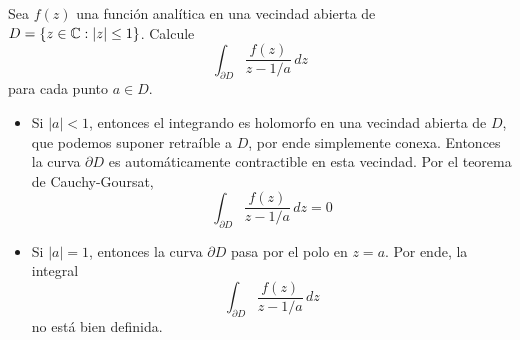 \begin{exercise}
Sea $f(z)$ una función analítica en una vecindad abierta de $D = \{ z \in \mathbb C : |z| \le 1 \}$. Calcule
$$\int_{\partial D} \frac {f(z)} {z - 1/a} \, dz$$
para cada punto $a \in D$.
\end{exercise}

\begin{solution}
\leavevmode
\begin{itemize}
    \item Si $|a| < 1$, entonces el integrando es holomorfo en una vecindad abierta de $D$, que podemos suponer retraíble a $D$, por ende simplemente conexa. Entonces la curva $\partial D$ es automáticamente contractible en esta vecindad. Por el teorema de Cauchy-Goursat,
    $$\int_{\partial D} \frac {f(z)} {z - 1/a} \, dz = 0$$
    
    \item Si $|a| = 1$, entonces la curva $\partial D$ pasa por el polo en $z = a$. Por ende, la integral
    $$\int_{\partial D} \frac {f(z)} {z - 1/a} \, dz$$
    no está bien definida.
\end{itemize}
\end{solution}
